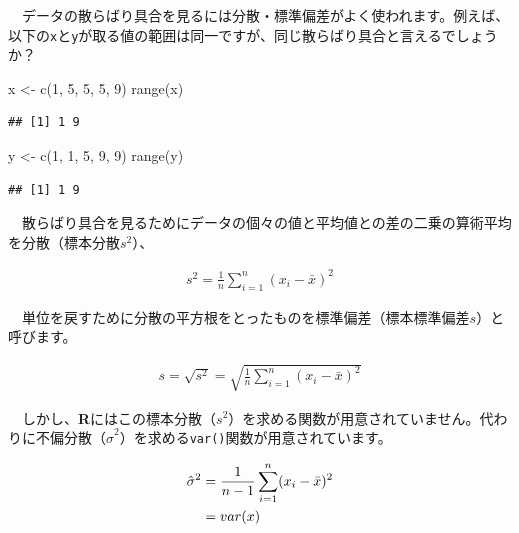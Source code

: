 \documentclass[
  12pt,
]{book}
\newenvironment{Shaded}{\begin{snugshade}}{\end{snugshade}}
\newcommand{\DecValTok}[1]{\textcolor[rgb]{0.00,0.00,0.81}{#1}}
\newcommand{\FunctionTok}[1]{\textcolor[rgb]{0.00,0.00,0.00}{#1}}
\newcommand{\NormalTok}[1]{#1}
\newcommand{\OtherTok}[1]{\textcolor[rgb]{0.56,0.35,0.01}{#1}}
\begin{document}
　データの散らばり具合を見るには分散・標準偏差がよく使われます。例えば、以下の\texttt{x}と\texttt{y}が取る値の範囲は同一ですが、同じ散らばり具合と言えるでしょうか？

\begin{Shaded}
\begin{Highlighting}[numbers=left,,]
\NormalTok{x }\OtherTok{\textless{}{-}} \FunctionTok{c}\NormalTok{(}\DecValTok{1}\NormalTok{, }\DecValTok{5}\NormalTok{, }\DecValTok{5}\NormalTok{, }\DecValTok{5}\NormalTok{, }\DecValTok{9}\NormalTok{)}
\FunctionTok{range}\NormalTok{(x)}
\end{Highlighting}
\end{Shaded}

\begin{verbatim}
## [1] 1 9
\end{verbatim}

\begin{Shaded}
\begin{Highlighting}[numbers=left,,]
\NormalTok{y }\OtherTok{\textless{}{-}} \FunctionTok{c}\NormalTok{(}\DecValTok{1}\NormalTok{, }\DecValTok{1}\NormalTok{, }\DecValTok{5}\NormalTok{, }\DecValTok{9}\NormalTok{, }\DecValTok{9}\NormalTok{)}
\FunctionTok{range}\NormalTok{(y)}
\end{Highlighting}
\end{Shaded}

\begin{verbatim}
## [1] 1 9
\end{verbatim}

　散らばり具合を見るためにデータの個々の値と平均値との差の二乗の算術平均を分散（標本分散\(s^2\)）、

\begin{align}
  s^2 = \frac{1}{n} \sum_{i = 1}^n (x_i - \bar{x})^2 \label{eq:variance}
\end{align}

　単位を戻すために分散の平方根をとったものを標準偏差（標本標準偏差\(s\)）と呼びます。

\begin{align}
  s = \sqrt{s^2} = \sqrt{\frac{1}{n} \sum_{i = 1}^n (x_i - \bar{x})^2} \label{eq:standatd-deviation}
\end{align}

　しかし、\textbf{R}にはこの標本分散（\(s^2\)）を求める関数が用意されていません。代わりに不偏分散（\(\hat{\sigma}^2\)）を求める\texttt{var()}関数が用意されています。

\begin{align}
  \hat{\sigma}^2 &= \frac{1}{n - 1} \sum_{i = 1}^n (x_i - \bar{x})^2 \label{eq:var} \\
  &= var(x) \notag
\end{align}
\end{document}
